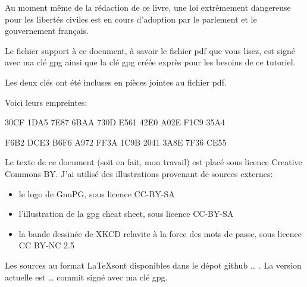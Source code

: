 \documentclass[10pt,a4paper]{book}
\begin{document}
		Au moment même de la rédaction de ce livre, une loi extrêmement dangereuse pour les libertés civiles est en cours d'adoption par le parlement et le gouvernement français.
		
		Le fichier support à ce document, à savoir le fichier pdf que vous lisez, est signé avec ma clé gpg ainsi que la clé gpg créée exprès pour les besoins de ce tutoriel.
		
		Les deux clés ont été incluses en pièces jointes au fichier pdf.
	
	Voici leurs empreintes:
	
		\begin{center}
			30CF 1DA5 7E87 6BAA 730D E561 42E0 A02E F1C9 35A4
		\end{center}
		
		\begin{center}
			F6B2 DCE3 B6F6 A972 FF3A 1C9B 2041 3A8E 7F36 CE55
		\end{center}
	
	Le texte de ce document (soit en fait, mon travail) est placé sous licence Creative Commons BY. J'ai utilisé des illustrations provenant de sources externes:
	\begin{itemize}
		\item le logo de GnuPG, sous licence CC-BY-SA
		\item l'illustration de la gpg cheat sheet, sous licence CC-BY-SA
		\item la bande dessinée de XKCD relavite à la force des mots de passe, sous licence CC BY-NC 2.5
	\end{itemize}
	
	Les sources au format \LaTeX sont disponibles dans le dépot github … . La version actuelle est … commit signé avec ma clé gpg.
	
	\tableofcontents
	
	
	
	
	\mainmatter
		
	
	
		
	
	
	
	
\end{document}
